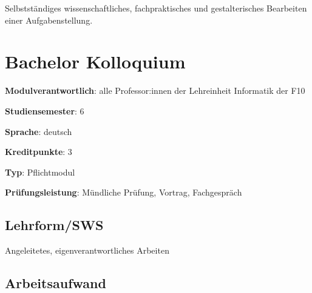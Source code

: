 Selbstständiges wissenschaftliches, fachpraktisches und gestalterisches
Bearbeiten einer Aufgabenstellung.

\hypertarget{bachelor-kolloquiumpathlabelmi-2017modulbeschreibungen-bachelorba_bachelorkolloquium}{%
\chapter{Bachelor
Kolloquium\label{/mi-2017/modulbeschreibungen-bachelor/BA_Bachelorkolloquium}}\label{bachelor-kolloquiumpathlabelmi-2017modulbeschreibungen-bachelorba_bachelorkolloquium}}

\begin{modulHead}
\textbf{Modulverantwortlich}: alle Professor:innen
der Lehreinheit Informatik der
F10
\end{modulHead}
\begin{modulHead}
\textbf{Studiensemester}:
6
\end{modulHead}
\begin{modulHead}
\textbf{Sprache}:
deutsch
\end{modulHead}
\begin{modulHead}
\textbf{Kreditpunkte}:
3
\end{modulHead}
\begin{modulHead}
\textbf{Typ}:
Pflichtmodul
\end{modulHead}
\begin{modulHead}
\textbf{Prüfungsleistung}:
Mündliche Prüfung, Vortrag, Fachgespräch
\end{modulHead}


\hypertarget{lehrformswspathlabelmi-2017modulbeschreibungen-bachelorba_bachelorkolloquium}{%
\section*{Lehrform/SWS\label{/mi-2017/modulbeschreibungen-bachelor/BA_Bachelorkolloquium}}\label{lehrformswspathlabelmi-2017modulbeschreibungen-bachelorba_bachelorkolloquium}}

Angeleitetes, eigenverantwortliches Arbeiten

\hypertarget{arbeitsaufwandpathlabelmi-2017modulbeschreibungen-bachelorba_bachelorkolloquium}{%
\section*{Arbeitsaufwand\label{/mi-2017/modulbeschreibungen-bachelor/BA_Bachelorkolloquium}}\label{arbeitsaufwandpathlabelmi-2017modulbeschreibungen-bachelorba_bachelorkolloquium}}

